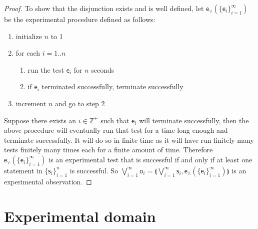 \documentclass[11pt,letterpaper,fleqn]{memoir} %
\begin{document}
\begin{mathSection}
\begin{proof}
	To show that the disjunction exists and is well defined, let $\mathsf{e}_\vee(\{\mathsf{e}_i\}_{i=1}^{\infty})$ be the experimental procedure defined as follows:
	\begin{enumerate}
	\item initialize $n$ to 1
	\item for each $i=1..n$
	\begin{enumerate}
		\item run the test $\mathsf{e}_i$ for $n$ seconds
		\item if $\mathsf{e}_i$ terminated successfully, terminate successfully
	\end{enumerate}
	\item increment $n$ and go to step 2
	\end{enumerate}
	Suppose there exists an $i \in \mathbb{Z}^+$ such that $\mathsf{e}_i$ will terminate successfully, then the above procedure will eventually run that test for a time long enough and terminate successfully. It will do so in finite time as it will have run finitely many tests finitely many times each for a finite amount of time. Therefore $\mathsf{e}_\vee(\{\mathsf{e}_i\}_{i=1}^{\infty})$ is an experimental test that is successful if and only if at least one statement in $\{\mathsf{s}_i\}_{i=1}^{n}$ is successful. So $\bigvee\limits_{i=1}^{\infty} \mathsf{o}_i =\llparenthesis\bigvee\limits_{i=1}^{\infty} \mathsf{s}_i, \mathsf{e}_{\wedge}(\{\mathsf{e}_i\}_{i=1}^{\infty})\rrparenthesis$ is an experimental observation.
\end{proof}

\end{mathSection}

\section{Experimental domain}
\end{document}
